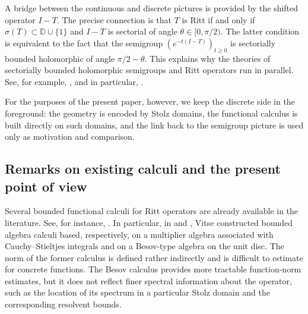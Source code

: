 \documentclass[11pt]{amsart}
\numberwithin{equation}{section}
\theoremstyle{definition}
\theoremstyle{plain}
\def\D{\mathbb{D}}
\begin{document}
A bridge between the continuous and discrete pictures is provided by the shifted operator $I-T$. The precise connection is that $T$ is Ritt if and only if 
$\sigma(T)\subset\D\cup\{1\}$ and $I-T$ is sectorial of angle $\theta\in [0,\pi/2).$
 The latter condition is equivalent to the fact that the semigroup $(e^{-t(I-T)})_{t\ge0}$ is sectorially bounded holomorphic of angle $\pi/2-\theta.$
This explains why the theories of sectorially bounded holomorphic semigroups and Ritt operators run in parallel. See, for example, \cite{Blunck1,Blunck2, Haase,Dungey,GomTom-Indiana}, and in particular, \cite[Chapter 2.2]{LeMerdy}.

For the purposes of the present paper, however, we keep the discrete side in the foreground: the geometry is encoded by Stolz domains, the functional calculus is built directly on such domains, and the link back to the semigroup picture is used only as motivation and comparison.

\subsection{Remarks on existing calculi and the present point of view}
Several bounded functional calculi for Ritt operators are already available in the literature. See, for instance, \cite{Arhancet-LeMerdy,Lancien,Nikolski,Schwenninger,Vitse-JFA,Vitse-Arch}. In particular, in \cite{Vitse-JFA} and \cite{Vitse-Arch}, Vitse
constructed bounded algebra calculi
based, respectively, on a multiplier algebra associated with
Cauchy--Stieltjes integrals and on a Besov-type algebra on the unit disc.
The norm of the former calculus is defined rather indirectly and is
difficult to estimate for concrete functions. The Besov calculus provides
more tractable function-norm estimates, but it does not reflect finer
spectral information about the operator, such as the location of its
spectrum in a particular Stolz domain and the corresponding resolvent
bounds.
\end{document}
